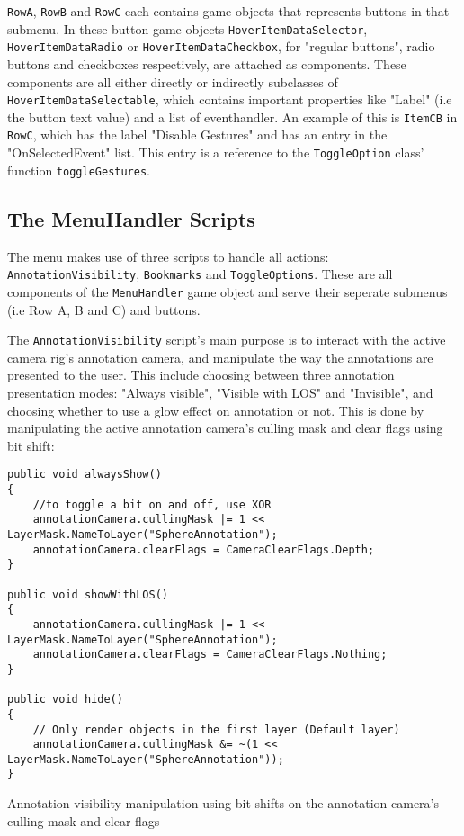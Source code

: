 \texttt{RowA}, \texttt{RowB} and \texttt{RowC} each contains game objects that represents buttons in that submenu. 
In these button game objects \texttt{HoverItemDataSelector}, \texttt{HoverItemDataRadio} or \texttt{HoverItemDataCheckbox}, for "regular buttons", radio buttons and 
checkboxes respectively, are attached as components. These components are all either directly or indirectly subclasses of \texttt{HoverItemDataSelectable}, which 
contains important properties like "Label" (i.e the button text value) and a list of eventhandler. An example of this is \texttt{ItemCB} in \texttt{RowC}, which has 
the label "Disable Gestures" and has an entry in the "OnSelectedEvent" list. This entry is a reference to the \texttt{ToggleOption} class' function \texttt{toggleGestures}. 

\subsection{The MenuHandler Scripts}
The menu makes use of three scripts to handle all actions: \texttt{AnnotationVisibility}, \texttt{Bookmarks} and \texttt{ToggleOptions}.
These are all components of the \texttt{MenuHandler} game object and serve their seperate submenus (i.e Row A, B and C) and buttons. 

The \texttt{AnnotationVisibility} script's main purpose is to interact with the active camera rig's annotation camera, and manipulate the way
the annotations are presented to the user. This include choosing between three annotation presentation modes: "Always visible", "Visible with LOS" and 
"Invisible", and choosing whether to use a glow effect on annotation or not. This is done by manipulating the active annotation camera's culling mask 
and clear flags using bit shift:

\begin{table}
\label{table:annotation_visibility_code}
\lstset{style=csharp}
\begin{lstlisting}
public void alwaysShow()
{
	//to toggle a bit on and off, use XOR
	annotationCamera.cullingMask |= 1 << LayerMask.NameToLayer("SphereAnnotation");
	annotationCamera.clearFlags = CameraClearFlags.Depth;
}

public void showWithLOS()
{
	annotationCamera.cullingMask |= 1 << LayerMask.NameToLayer("SphereAnnotation");
	annotationCamera.clearFlags = CameraClearFlags.Nothing;
}

public void hide()
{
	// Only render objects in the first layer (Default layer)
	annotationCamera.cullingMask &= ~(1 << LayerMask.NameToLayer("SphereAnnotation"));
}
\end{lstlisting}
\caption[Annotation visibility manipulation]{Annotation visibility manipulation using bit shifts on the annotation camera's culling mask and clear-flags}
\end{table}


